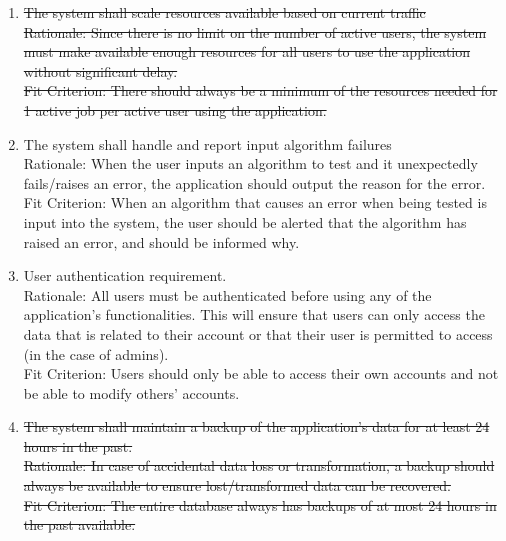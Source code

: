 \documentclass{article}
\begin{document}
\begin{enumerate}[label=\textbf{SR-\arabic*:}]{\leftmargin=1em \itemindent=0em}
{    \newline Fit Criterion: If a running job hits the maximum runtime, it will be terminated immediately with an output indicating that the maximum runtime has been reached.}
    \item \sout{ The system shall scale resources available based on current traffic \\
    \newline Rationale: Since there is no limit on the number of active users, the system must make available enough resources for all users to use the application without significant delay. \\
    \newline Fit Criterion: There should always be a minimum of the resources needed for 1 active job per active user using the application.}
    \item The system shall handle and report input algorithm failures \\
    \newline Rationale: When the user inputs an algorithm to test and it unexpectedly fails/raises an error, the application should output the reason for the error. \\
    \newline Fit Criterion: When an algorithm that causes an error when being tested is input into the system, the user should be alerted that the algorithm has raised an error, and should be informed why.
    \item User authentication requirement. \\
    \newline Rationale: All users must be authenticated before using any of the application’s functionalities. This will ensure that users can only access the data that is related to their account or that their user is permitted to access (in the case of admins). \\
    \newline Fit Criterion: Users should only be able to access their own accounts and not be able to modify others’ accounts.
    \item \sout{The system shall maintain a backup of the application’s data for at least 24 hours in the past. \\
    \newline Rationale: In case of accidental data loss or transformation, a backup should always be available to ensure lost/transformed data can be recovered. \\
    \newline Fit Criterion: The entire database always has backups of at most 24 hours in the past available. }
\end{enumerate}
\end{document}
